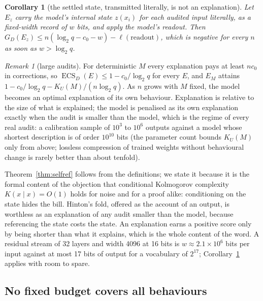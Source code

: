 \documentclass[11pt,letterpaper]{article}
\newcommand{\D}{D}
\DeclareMathOperator{\ECS}{ECS}
\newcommand{\cz}{c_{0}}
\newcommand{\Ltwo}{\log_{2}}
\theoremstyle{plain}
\newtheorem{corollary}{Corollary}
\theoremstyle{definition}
\theoremstyle{remark}
\newtheorem{remark}{Remark}
\begin{document}
\begin{corollary}[the settled state, transmitted literally, is not an explanation]
\label{cor:state}
Let $E_z$ carry the model's internal state $z(x_i)$ for each audited input literally, as a fixed-width record of $w$ bits, and apply the model's readout. Then $G_{\D}(E_z)\le n(\Ltwo q-\cz-w)-\ell(\mathrm{readout})$, which is negative for every $n$ as soon as $w>\Ltwo q$.
\end{corollary}

\begin{remark}[large audits]
\label{rem:large}
For deterministic $M$ every explanation pays at least $n\cz$ in corrections, so $\ECS_{\D}(E)\le 1-\cz/\Ltwo q$ for every $E$, and $E_M$ attains $1-\cz/\Ltwo q-K_U(M)/(n\Ltwo q)$. As $n$ grows with $M$ fixed, the model becomes an optimal explanation of its own behaviour. Explanation is relative to the size of what is explained; the model is penalised as its own explanation exactly when the audit is smaller than the model, which is the regime of every real audit: a calibration sample of $10^{3}$ to $10^{6}$ outputs against a model whose shortest description is of order $10^{10}$ bits (the parameter count bounds $K_U(M)$ only from above; lossless compression of trained weights without behavioural change is rarely better than about tenfold).
\end{remark}

Theorem~\ref{thm:selfref} follows from the definitions; we state it because it is the formal content of the objection that conditional Kolmogorov complexity $K(x\mid x)=O(1)$ holds for noise and for a proof alike: conditioning on the state hides the bill. Hinton's fold, offered as the account of an output, is worthless as an explanation of any audit smaller than the model, because referencing the state costs the state. An explanation earns a positive score only by being shorter than what it explains, which is the whole content of the word. A residual stream of 32 layers and width 4096 at 16 bits is $w\approx 2.1\times10^{6}$ bits per input against at most 17 bits of output for a vocabulary of $2^{17}$; Corollary~\ref{cor:state} applies with room to spare.

\subsection{No fixed budget covers all behaviours}
\end{document}
